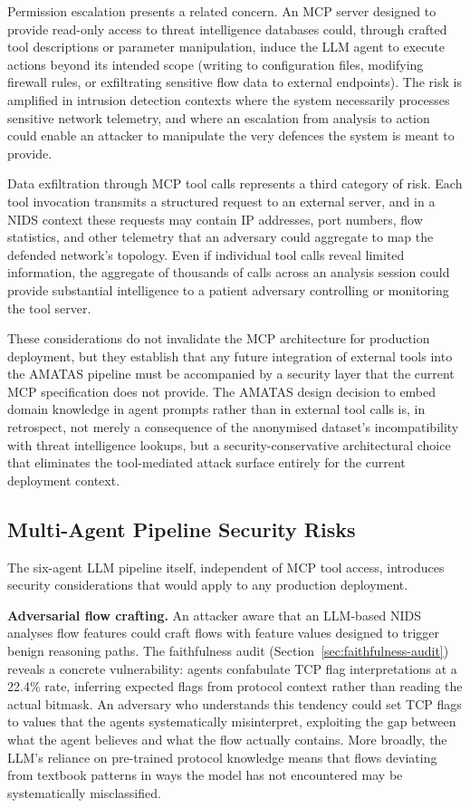 \documentclass[../main.tex]{subfiles}
\begin{document}
Permission escalation presents a related concern. An MCP server designed to provide read-only access to threat intelligence databases could, through crafted tool descriptions or parameter manipulation, induce the LLM agent to execute actions beyond its intended scope (writing to configuration files, modifying firewall rules, or exfiltrating sensitive flow data to external endpoints). The risk is amplified in intrusion detection contexts where the system necessarily processes sensitive network telemetry, and where an escalation from analysis to action could enable an attacker to manipulate the very defences the system is meant to provide.

Data exfiltration through MCP tool calls represents a third category of risk. Each tool invocation transmits a structured request to an external server, and in a NIDS context these requests may contain IP addresses, port numbers, flow statistics, and other telemetry that an adversary could aggregate to map the defended network's topology. Even if individual tool calls reveal limited information, the aggregate of thousands of calls across an analysis session could provide substantial intelligence to a patient adversary controlling or monitoring the tool server.

These considerations do not invalidate the MCP architecture for production deployment, but they establish that any future integration of external tools into the AMATAS pipeline must be accompanied by a security layer that the current MCP specification does not provide. The AMATAS design decision to embed domain knowledge in agent prompts rather than in external tool calls is, in retrospect, not merely a consequence of the anonymised dataset's incompatibility with threat intelligence lookups, but a security-conservative architectural choice that eliminates the tool-mediated attack surface entirely for the current deployment context.

\subsection{Multi-Agent Pipeline Security Risks}
\label{sec:pipeline-security}

The six-agent LLM pipeline itself, independent of MCP tool access, introduces security considerations that would apply to any production deployment.

\textbf{Adversarial flow crafting.} An attacker aware that an LLM-based NIDS analyses flow features could craft flows with feature values designed to trigger benign reasoning paths. The faithfulness audit (Section~\ref{sec:faithfulness-audit}) reveals a concrete vulnerability: agents confabulate TCP flag interpretations at a 22.4\% rate, inferring expected flags from protocol context rather than reading the actual bitmask. An adversary who understands this tendency could set TCP flags to values that the agents systematically misinterpret, exploiting the gap between what the agent believes and what the flow actually contains. More broadly, the LLM's reliance on pre-trained protocol knowledge means that flows deviating from textbook patterns in ways the model has not encountered may be systematically misclassified.
\end{document}
